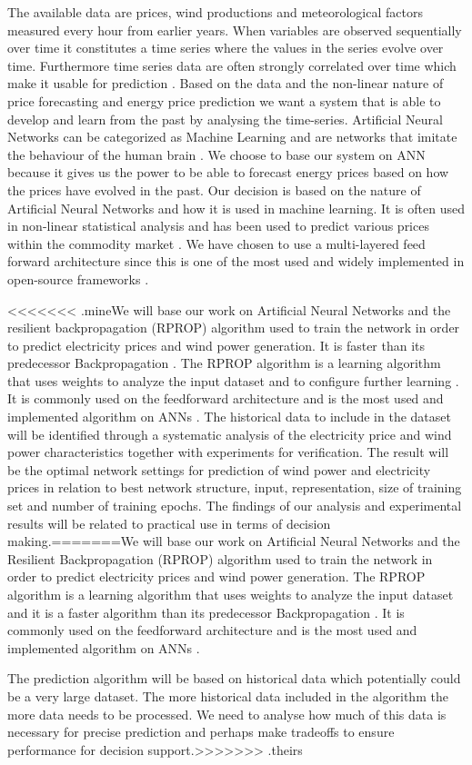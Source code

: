 The available data are prices, wind productions and meteorological factors measured every hour from earlier years. When variables are observed sequentially over time it constitutes a time series where the values in the series evolve over time. Furthermore time series data are often strongly correlated over time which make it usable for prediction \cite[Chapter~7.1.2]{econometrics}. Based on the data and the non-linear nature of price forecasting and energy price prediction we want a system that is able to develop and learn from the past by analysing the time-series. Artificial Neural Networks can be categorized as Machine Learning \cite{18} and are networks that imitate the behaviour of the human brain \cite{1}. We choose to base our system on ANN because it gives us the power to be able to forecast energy prices based on how the prices have evolved in the past. Our decision is based on the nature of Artificial Neural Networks and how it is used in machine learning. It is often used in non-linear statistical analysis \cite{16} and has been used to predict various prices within the commodity market \cite{2,3,stockForecasting,pjmForecast}. We have chosen to use a multi-layered feed forward architecture since this is one of the most used and widely implemented in open-source frameworks \cite{17}.

<<<<<<< .mineWe will base our work on Artificial Neural Networks and the resilient backpropagation (RPROP) algorithm used to train the network in order to predict electricity prices and wind power generation. It is faster than its predecessor Backpropagation \cite{8,15}.  The RPROP algorithm is a learning algorithm that uses weights to analyze the input dataset and to configure further learning \cite{17}. It is commonly used on the feedforward architecture and is the most used and implemented algorithm on ANNs \cite{14,17}. The historical data to include in the dataset will be identified through a systematic analysis of the electricity price and wind power characteristics together with experiments for verification. The result will be the optimal network settings for prediction of wind power and electricity prices in relation to best network structure, input, representation, size of training set and number of training epochs. The findings of our analysis and experimental results will be related to practical use in terms of decision making.=======We will base our work on Artificial Neural Networks and the Resilient Backpropagation (RPROP) algorithm used to train the network in order to predict electricity prices and wind power generation. The RPROP algorithm is a learning algorithm that uses weights to analyze the input dataset\cite{17} and it is a faster algorithm than its predecessor Backpropagation \cite{8,15}. It is commonly used on the feedforward architecture and is the most used and implemented algorithm on ANNs \cite{14,17}.

The prediction algorithm will be based on historical data which potentially could be a very large dataset. The more historical data included in the algorithm the more data needs to be processed. We need to analyse how much of this data is necessary for precise prediction and perhaps make tradeoffs to ensure performance for decision support.>>>>>>> .theirs